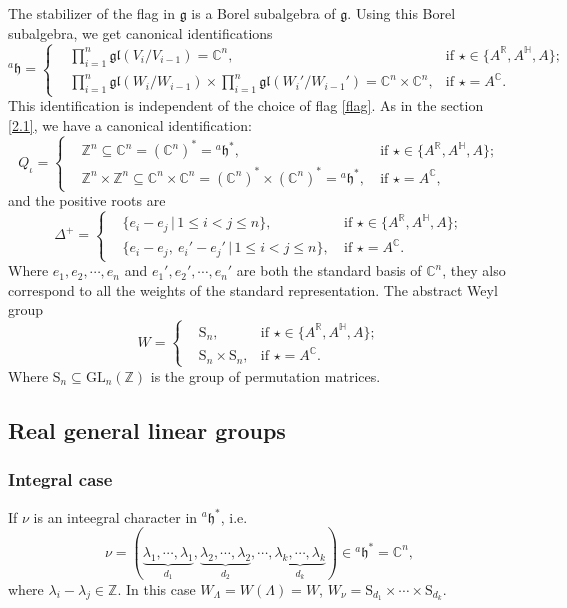 \documentclass[12pt, a4paper]{amsart}
\numberwithin{equation}{section}
\newcommand{\BC}{{\mathbb {C}}}
\newcommand{\BH}{{\mathbb {H}}}
\newcommand{\BR}{{\mathbb {R}}}
\newcommand{\BZ}{{\mathbb {Z}}}
\newcommand{\fg}{\mathfrak{g}}
\newcommand{\fh}{\mathfrak{h}}
\newcommand{\fgl}{{\mathfrak{gl}}}
\newcommand{\GL}{{\mathrm{GL}}}
\newcommand{\set}[2]{\{#1\,|\,#2\}}
\begin{document}
The stabilizer of the flag in $\fg$ is a Borel subalgebra of $\fg$. Using this Borel subalgebra, we get canonical identifications
$$ {^{a}\fh} = \left\{
   \begin{aligned}
       &\prod^{n}_{i=1}\fgl(V_i/V_{i-1}) = \BC^n, & \textrm{if $\star \in \{A^\BR,A^\BH,A\}$};\\
       &\prod^{n}_{i=1}\fgl(W_i/W_{i-1}) \times \prod^{n}_{i=1}\fgl(W_{i}'/W_{i-1}') = \BC^n \times \BC^n, & \textrm{if $\star = A^\BC$}.
   \end{aligned}
   \right.$$
This identification is independent of the choice of flag \ref{flag}. As in the section \ref{2.1}, we have a canonical identification:
$$
    Q_{\iota} = \left\{
    \begin{aligned}
        & \BZ^n \subseteq \BC^n = (\BC^n)^* = {^{a}\fh^*}, \ &\textrm{if $\star \in \{A^\BR, A^\BH,A\}$};\\
        & \BZ^n \times \BZ^n \subseteq \BC^n \times \BC^n = (\BC^n)^*\times(\BC^n)^* = {^{a}\fh^*}, \ &\textrm{if $\star = A^\BC$},
   \end{aligned}
   \right.
$$
and the positive roots are 
$$ \Delta^+ = \left\{
    \begin{aligned}
        &\set{e_i - e_j}{1 \leq i < j \leq n}, \ &\textrm{if $\star \in \{A^\BR,A^\BH,A\}$};\\
        &\set{e_i - e_j, \ e_i' - e_j'}{1\leq i<j\leq n}, \ & \textrm{if $\star = A^\BC$}.
    \end{aligned}
   \right.
$$
Where $e_1,e_2,\cdots,e_n$ and $e_1', e_2', \cdots, e_n'$ are both the standard basis of $\BC^n$, they also correspond to all the weights of the standard representation.
The abstract Weyl group 
$$
   W = \left\{
   \begin{aligned}
       &\mathrm{S}_n, & \textrm{if $\star \in \{A^\BR,A^\BH,A\}$};\\
       &\mathrm{S}_n \times \mathrm{S}_n, & \textrm{if $\star = A^\BC$}.
   \end{aligned}
   \right.
$$
Where $\mathrm{S}_n \subseteq \GL_n(\BZ)$ is the group of permutation matrices.




\subsection{Real general linear groups}\label{3.2}
\subsubsection{Integral case}
If $\nu$ is an inteegral character in ${^{a}\fh}^*$, i.e. 
$$\nu = (\underbrace{\lambda_1, \cdots, \lambda_1}_{d_1}, \underbrace{\lambda_2, \cdots, \lambda_2}_{d_2}, \cdots, \underbrace{\lambda_k, \cdots, \lambda_k}_{d_k} ) \in {^{a}\fh}^* = \BC^n,$$ 
where $\lambda_i - \lambda_j \in \BZ$. In this case $W_{\Lambda} = W(\Lambda) = W$, $W_\nu = \mathrm{S}_{d_1} \times \cdots \times \mathrm{S}_{d_k}$. 
\end{document}
